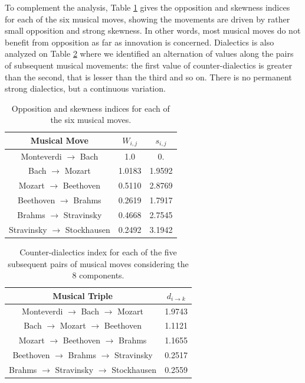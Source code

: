 \documentclass[
 aip,
 jmp,
 amsmath,amssymb,
 reprint,
]{revtex4-1}
\begin{document}
To complement the analysis, Table \ref{tab:tableOI} gives the
opposition and skewness indices for each of the six musical moves,
showing the movements are driven by rather small opposition and strong
skewness. In other words, most musical moves do not benefit from
opposition as far as innovation is concerned. Dialectics is also analyzed on Table
\ref{tab:tableE} where we identified an alternation of values along
the pairs of subsequent musical movements: the first value of
counter-dialectics is greater than the second, that is lesser than the %
third and so on. There is no permanent strong
dialectics, but a continuous variation.

\begin{table}[ht]
\caption{\label{tab:tableOI}Opposition and skewness indices for each
of the six musical moves.}

\begin{tabular}{|c||c|c|}
\hline
Musical Move & $W_{i,j}$ & $s_{i,j}$ \\
\hline \hline

 Monteverdi $\to$ Bach             &   1.0     &  0.      \\
 Bach $\to$ Mozart                 &   1.0183  &  1.9592  \\
 Mozart $\to$ Beethoven            &   0.5110  &  2.8769  \\
 Beethoven $\to$ Brahms            &   0.2619  &  1.7917  \\
 Brahms $\to$ Stravinsky           &   0.4668  &  2.7545  \\
 Stravinsky $\to$ Stockhausen      &   0.2492  &  3.1942  \\

\hline
\end{tabular}
\end{table}

\begin{table}[ht]
\caption{\label{tab:tableE} Counter-dialectics index for each
of the five subsequent pairs of musical moves considering the 8 components.}

\begin{tabular}{|c||c|}
\hline
Musical Triple & $d_{i \rightarrow k}$ \\
\hline \hline

 Monteverdi $\to$ Bach $\to$ Mozart          & 1.9743 \\
 Bach $\to$ Mozart $\to$ Beethoven           & 1.1121 \\
 Mozart $\to$ Beethoven $\to$ Brahms         & 1.1655 \\
 Beethoven $\to$ Brahms $\to$ Stravinsky     & 0.2517 \\
 Brahms $\to$ Stravinsky $\to$ Stockhausen   & 0.2559 \\

\hline
\end{tabular}
\end{table}
\end{document}
